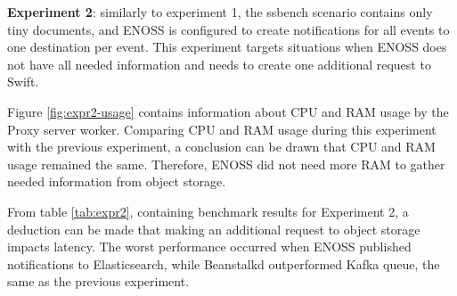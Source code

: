     \textbf{Experiment 2}: similarly to experiment 1, the ssbench scenario contains only tiny documents, and ENOSS is configured to create notifications for all events to one destination per event. This experiment targets situations when ENOSS does not have all needed information and needs to create one additional request to Swift.

    Figure \ref{fig:expr2-usage} contains information about CPU and RAM usage by the Proxy server worker. Comparing CPU and RAM usage during this experiment with the previous experiment, a conclusion can be drawn that CPU and RAM usage remained the same. Therefore, ENOSS did not need more RAM to gather needed information from object storage.

    From table \ref{tab:expr2}, containing benchmark results for Experiment 2, a deduction can be made that making an additional request to object storage impacts latency. The worst performance occurred when ENOSS published notifications to Elasticsearch, while Beanstalkd outperformed Kafka queue, the same as the previous experiment.

